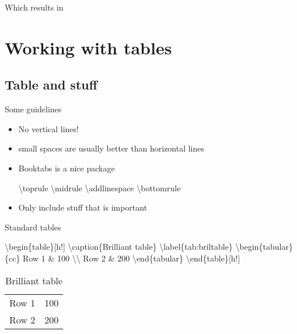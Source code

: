 \documentclass[ignorenonframetext,]{beamer}
\newenvironment{Shaded}{\begin{snugshade}}{\end{snugshade}}
\newcommand{\NormalTok}[1]{{#1}}
\begin{document}
\begin{frame}{Which results in}


\end{frame}

\section{Working with tables}\label{better-tables}
\subsection{Table and stuff}

\begin{frame}[fragile]{Some guidelines}
\begin{itemize}
\item
  No vertical lines!
\item
  small spaces are usually better than horizontal lines
\item
  Booktabs is a nice package
\begin{Shaded}
\begin{Highlighting}[]
\NormalTok{\textbackslash{}toprule}
\NormalTok{\textbackslash{}midrule}
\NormalTok{\textbackslash{}addlinespace}
\NormalTok{\textbackslash{}bottomrule}
\end{Highlighting}
\end{Shaded}
\item
  Only include stuff that is important
\end{itemize}
\end{frame}

\begin{frame}[fragile]{Standard tables}
\begin{Shaded}
\begin{Highlighting}
\NormalTok{\textbackslash{}begin\{table\}[h!]}
	\NormalTok{\textbackslash{}caption\{Brilliant table\}}
	\NormalTok{\textbackslash{}label\{tab:briltable\}}
	\NormalTok{\textbackslash{}begin\{tabular\}\{cc\}}
		\NormalTok{Row 1 & 100 \textbackslash{}\textbackslash{}}
		\NormalTok{Row 2 & 200 }
	\NormalTok{\textbackslash{}end\{tabular\}}
\NormalTok{\textbackslash{}end\{table\}[h!]}	
\end{Highlighting}
\end{Shaded}
\begin{table}
	\caption{Brilliant table}
	\label{tab:briltable}
	\begin{tabular}{cc}
		Row 1 & 100 \\
		Row 2 & 200
	\end{tabular}
\end{table}
\end{frame}
\end{document}
